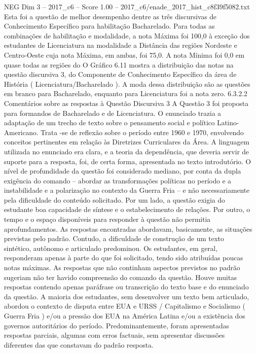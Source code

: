 \begin{textsample}{NEG Dim 3 – 2017\_c6 – Score 1.00 – 2017\_c6/enade\_2017\_hist\_c8f39f5082.txt}
Esta foi a questão de melhor desempenho dentre as três discursivas de Conhecimento Específico para habilitação Bacharelado.
Para todas as combinações de habilitação e modalidade, a nota Máxima foi 100,0 à exceção dos estudantes de Licenciatura na modalidade a Distância das regiões Nordeste e Centro-Oeste cuja nota Máxima, em ambas, foi 75,0.
A nota Mínima foi 0,0 em quase todas as regiões do O Gráfico 6.11 mostra a distribuição das notas na questão discursiva 3, do Componente de Conhecimento Específico da área de História ( Licenciatura/Bacharelado ).
A moda dessa distribuição são as questões em branco para Bacharelado, enquanto para Licenciatura foi a nota zero. 6.3.2.2 Comentários sobre as respostas à Questão Discursiva 3 A Questão 3 foi proposta para formandos de Bacharelado e de Licenciatura.
O enunciado trazia a adaptação de um trecho de texto sobre o pensamento social e político Latino-Americano.
Trata -se de reflexão sobre o período entre 1960 e 1970, envolvendo conceitos pertinentes em relação às Diretrizes Curriculares da Área.
A linguagem utilizada no enunciado era clara, e a teoria da dependência, que deveria servir de suporte para a resposta, foi, de certa forma, apresentada no texto introdutório.
O nível de profundidade da questão foi considerado mediano, por conta da dupla exigência do comando – abordar as transformações políticas no período e a instabilidade e a polarização no contexto da Guerra Fria – e não necessariamente pela dificuldade do conteúdo solicitado.
Por um lado, a questão exigia do estudante boa capacidade de síntese e o estabelecimento de relações.
Por outro, o tempo e o espaço disponíveis para responder à questão não permitia aprofundamentos.
As respostas encontradas abordavam, basicamente, as situações previstas pelo padrão.
Contudo, a dificuldade de construção de um texto sintético, autônomo e articulado predominou.
Os estudantes, em geral, responderam apenas à parte do que foi solicitado, tendo sido atribuídas poucas notas máximas.
As respostas que não continham aspectos previstos no padrão sugeriam não ter havido compreensão do comando da questão.
Houve muitas respostas contendo apenas paráfrase ou transcrição do texto base e do enunciado da questão.
A maioria dos estudantes, sem desenvolver um texto bem articulado, abordou o contexto de disputa entre EUA e URSS / Capitalismo e Socialismo ( Guerra Fria ) e/ou a pressão dos EUA na América Latina e/ou a existência dos governos autoritários do período.
Predominantemente, foram apresentadas respostas parciais, algumas com erros factuais, sem apresentar discussões diferentes das que constavam do padrão resposta.

\end{textsample}
